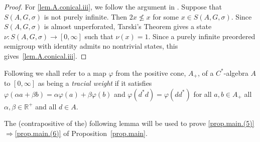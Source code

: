 \documentclass[a4paper, 12pt]{amsart}
\numberwithin{equation}{section}
\theoremstyle{remark}
\theoremstyle{definition}
\begin{document}
\begin{proof}
For \eqref{lem.A.conical.iii}, we follow the argument in \cite[p.~95]{Sie}. Suppose that $S(A,G,\sigma)$ is
not purely infinite. Then $2x \not\leq x$ for some $x\in S(A,G,\sigma)$. Since
$S(A,G,\sigma)$ is almost unperforated, Tarski's Theorem gives a state $\nu\colon
S(A,G,\sigma)\to [0,\infty]$ such that $\nu(x)=1$. Since a purely infinite preordered
semigroup with identity admits no nontrivial states, this gives~\eqref{lem.A.conical.iii}.
\end{proof}

Following \cite{MR1172023} we shall refer to a map $\varphi$ from the positive cone,
$A_+$, of a $C^*$-algebra $A$ to $[0,\infty]$ as being a \emph{tracial weight} if it
satisfies $\varphi(\alpha a + \beta b) = \alpha \varphi(a) + \beta \varphi(b)$ and
$\varphi(d^*d) = \varphi(dd^*)$ for all $a,b\in A_+$ all $\alpha,\beta \in {\mathbb{R}}^+$ and all
$d\in A$.

The (contrapositive of the) following lemma will be used to prove \eqref{prop.main.(5)}$\Rightarrow$\eqref{prop.main.(6)} of
Proposition~\ref{prop.main}.
\end{document}
